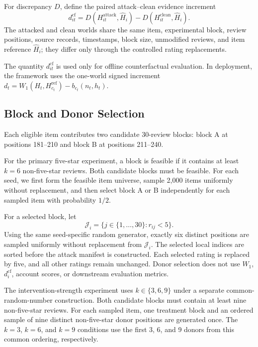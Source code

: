 For discrepancy $D$, define the paired attack--clean evidence increment
\[
d_{it}^{\mathrm{cf}}
=
D(H_{it}^{\mathrm{attack}},\widehat H_i)
-
D(H_{it}^{\mathrm{clean}},\widehat H_i).
\]
The attacked and clean worlds share the same item, experimental block, review
positions, source records, timestamps, block size, unmodified reviews, and
item reference $\widehat H_i$; they differ only through the controlled rating
replacements.

The quantity $d_{it}^{\mathrm{cf}}$ is used only for offline counterfactual
evaluation. In deployment, the framework uses the one-world signed increment
$d_t=W_1(H_t,H_{c_t}^{\mathrm{ref}})-b_{c_t}(n_t,h_t)$.


\subsection{Block and Donor Selection}
\label{sec:supp-block-selection}

Each eligible item contributes two candidate 30-review blocks: block A at
positions 181--210 and block B at positions 211--240.

For the primary five-star experiment, a block is feasible if it contains at
least $k=6$ non-five-star reviews. Both candidate blocks must be feasible.
For each seed, we first form the feasible item universe, sample 2,000 items
uniformly without replacement, and then select block A or B independently for
each sampled item with probability $1/2$.

For a selected block, let
\[
\mathcal J_i
=
\{j\in\{1,\ldots,30\}:r_{ij}<5\}.
\]
Using the same seed-specific random generator, exactly six distinct positions
are sampled uniformly without replacement from $\mathcal J_i$. The selected
local indices are sorted before the attack manifest is constructed. Each
selected rating is replaced by five, and all other ratings remain unchanged.
Donor selection does not use $W_1$, $d_i^{\mathrm{cf}}$, account scores, or
downstream evaluation metrics.

The intervention-strength experiment uses $k \in \{3,6,9\}$ under a
separate common-random-number construction. Both candidate blocks must
contain at least nine non-five-star reviews. For each sampled item, one
treatment block and an ordered sample of nine distinct non-five-star donor
positions are generated once. The $k=3$, $k=6$, and $k=9$ conditions use
the first 3, 6, and 9 donors from this common ordering, respectively.


